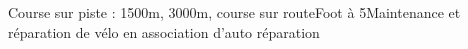 

\begin{cventries}

  \cventry
    {} %
    {Course sur piste : 1500m, 3000m, course sur route\newline Foot à 5\newline Maintenance et réparation de vélo en association d'auto réparation} %
    {} %
    {} %
    {
    }

\end{cventries}
